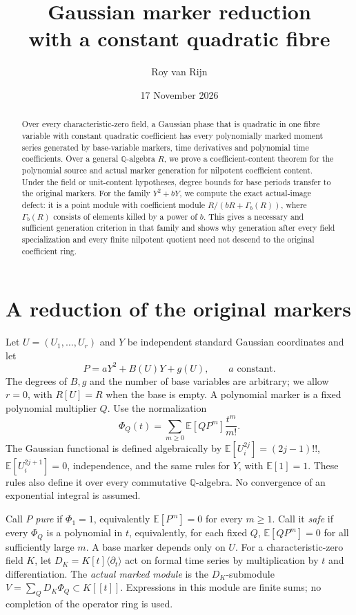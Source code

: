 \documentclass[11pt]{article}
\title{Gaussian marker reduction\\with a constant quadratic fibre}
\author{Roy van Rijn}\date{17 November 2026}
\theoremstyle{definition}\newtheorem{definition}[theorem]{Definition}
\theoremstyle{remark}\newtheorem{remark}[theorem]{Remark}
\newcommand{\E}{\mathbb E}
\begin{document}
\maketitle

\begin{abstract}
Over every characteristic-zero field, a Gaussian phase that is quadratic
in one fibre variable with constant quadratic coefficient has every
polynomially marked moment series generated by base-variable markers,
time derivatives and polynomial time coefficients. Over a general $\mathbb Q$-algebra $R$, we
prove a coefficient-content theorem for the polynomial source and actual
marker generation for nilpotent coefficient content. Under the field
or unit-content hypotheses, degree bounds for base periods transfer to
the original markers. For the family $Y^2+bY$, we compute
the exact actual-image defect: it is a point module with coefficient
module $R/(bR+\Gamma_b(R))$, where $\Gamma_b(R)$ consists of elements
killed by a power of $b$. This gives a necessary and sufficient
generation criterion in that family and shows why generation after
every field specialization and every finite nilpotent quotient need
not descend to the original coefficient ring.
\end{abstract}

\section{A reduction of the original markers}

Let $U=(U_1,\ldots,U_r)$ and $Y$ be independent standard Gaussian
coordinates and let
\[
 P=aY^2+B(U)Y+g(U),\qquad a\text{ constant}.
\]
The degrees of $B,g$ and the number of base variables are arbitrary;
we allow $r=0$, with $R[U]=R$ when the base is empty.
A polynomial marker is a fixed polynomial multiplier $Q$. Use the normalization
\[
 \Phi_Q(t)=\sum_{m\ge0}\E[QP^m]\frac{t^m}{m!}.
\]
The Gaussian functional is defined algebraically by
$\E[U_i^{2j}]=(2j-1)!!$, $\E[U_i^{2j+1}]=0$, independence,
and the same rules for $Y$, with $\E[1]=1$. These rules also define it
over every commutative $\mathbb Q$-algebra. No convergence of an
exponential integral is assumed.

Call $P$ \emph{pure} if $\Phi_1=1$, equivalently
$\E[P^m]=0$ for every $m\ge1$. Call it \emph{safe} if every
$\Phi_Q$ is a polynomial in $t$, equivalently, for each fixed $Q$,
$\E[QP^m]=0$ for all sufficiently large $m$. A base marker depends
only on $U$.
For a characteristic-zero field $K$, let
$D_K=K[t]\langle\partial_t\rangle$ act on formal time series by
multiplication by $t$ and differentiation. The \emph{actual marked
module} is the $D_K$-submodule
$V=\sum_Q D_K\Phi_Q\subset K[[t]]$. Expressions in this module
are finite sums; no completion of the operator ring is used.
\end{document}
